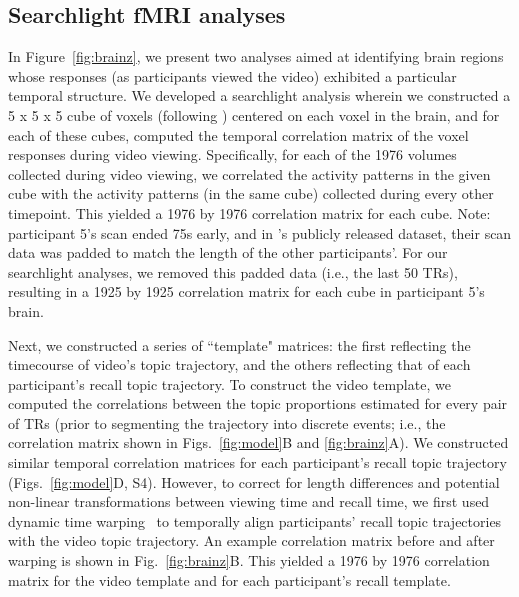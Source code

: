 \documentclass{article}
\newcommand{\corrmats}{S4}
\begin{document}
\subsection*{Searchlight fMRI analyses}
In Figure~\ref{fig:brainz}, we present two analyses aimed at identifying brain regions whose responses (as participants viewed the video) exhibited a particular temporal structure.  We developed a searchlight analysis wherein we constructed a 5 x 5 x 5 cube of voxels (following \citealp{ChenEtal17}) centered on each voxel in the brain, and for each of these cubes, computed the temporal correlation matrix of the voxel responses during video viewing.  Specifically, for each of the 1976 volumes collected during video viewing, we correlated the activity patterns in the given cube with the activity patterns (in the same cube) collected during every other timepoint.  This yielded a 1976 by 1976 correlation matrix for each cube.  Note: participant 5's scan ended 75s early, and in \citealp{ChenEtal17}'s publicly released dataset, their scan data was padded to match the length of the other participants'.  For our searchlight analyses, we removed this padded data (i.e., the last 50 TRs), resulting in a 1925 by 1925 correlation matrix for each cube in participant 5's brain.

Next, we constructed a series of ``template" matrices: the first reflecting the timecourse of video's topic trajectory, and the others reflecting that of each participant's recall topic trajectory.  To construct the video template, we computed the correlations between the topic proportions estimated for every pair of TRs (prior to segmenting the trajectory into discrete events; i.e., the correlation matrix shown in Figs.~\ref{fig:model}B and \ref{fig:brainz}A).  We constructed similar temporal correlation matrices for each participant's recall topic trajectory (Figs.~\ref{fig:model}D, \corrmats).  However, to correct for length differences and potential non-linear transformations between viewing time and recall time, we first used dynamic time warping~\citep{BernClif94} to temporally align participants' recall topic trajectories with the video topic trajectory.  An example correlation matrix before and after warping is shown in Fig.~\ref{fig:brainz}B.  This yielded a 1976 by 1976 correlation matrix for the video template and for each participant's recall template.
\end{document}
